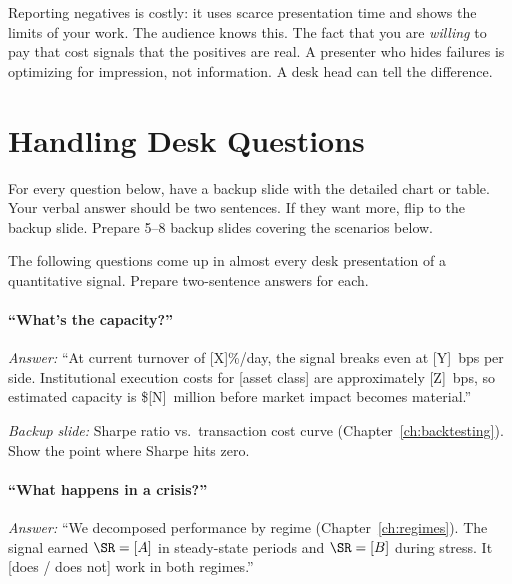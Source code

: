 \begin{intuition}
Reporting negatives is costly: it uses scarce presentation time and
shows the limits of your work.  The audience knows this.  The fact that
you are \emph{willing} to pay that cost signals that the positives are
real.  A presenter who hides failures is optimizing for impression, not
information.  A desk head can tell the difference.
\end{intuition}

\section{Handling Desk Questions}
\label{sec:presenting:questions}

\begin{prereq}
For every question below, have a backup slide with the detailed chart or
table.  Your verbal answer should be two sentences.  If they want more,
flip to the backup slide.  Prepare 5--8 backup slides covering the
scenarios below.
\end{prereq}

The following questions come up in almost every desk presentation of a
quantitative signal.  Prepare two-sentence answers for each.

\paragraph{``What's the capacity?''}
\emph{Answer:} ``At current turnover of [X]\%/day, the signal breaks
even at [Y]~bps per side.  Institutional execution costs for [asset
class] are approximately [Z]~bps, so estimated capacity is
\$[N]~million before market impact becomes material.''

\noindent\emph{Backup slide:} Sharpe ratio vs.\ transaction cost curve
(Chapter~\ref{ch:backtesting}).  Show the point where Sharpe hits zero.

\paragraph{``What happens in a crisis?''}
\emph{Answer:} ``We decomposed performance by regime
(Chapter~\ref{ch:regimes}).  The signal earned $\SR = [A]$ in
steady-state periods and $\SR = [B]$ during stress.  It [does / does
not] work in both regimes.''

